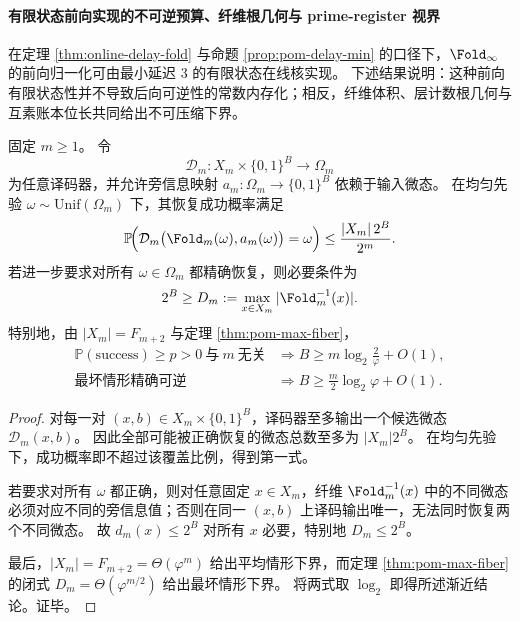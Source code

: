 \paragraph{有限状态前向实现的不可逆预算、纤维根几何与 prime-register 视界}
在定理 \ref{thm:online-delay-fold} 与命题 \ref{prop:pom-delay-min} 的口径下，\(\Fold_\infty\) 的前向归一化可由最小延迟 \(3\) 的有限状态在线核实现。
下述结果说明：这种前向有限状态性并不导致后向可逆性的常数内存化；相反，纤维体积、层计数根几何与互素账本位长共同给出不可压缩下界。

\begin{theorem}\label{thm:xi-time-part9k-fold-forward-online-not-constant-memory-reversible}
固定 \(m\ge 1\)。
令
\[
\mathcal D_m:X_m\times\{0,1\}^{B}\to\Omega_m
\]
为任意译码器，并允许旁信息映射
\(
a_m:\Omega_m\to\{0,1\}^{B}
\)
依赖于输入微态。
在均匀先验 \(\omega\sim\mathrm{Unif}(\Omega_m)\) 下，其恢复成功概率满足
\[
\mathbb P\!\Bigl(\mathcal D_m\bigl(\Fold_m(\omega),a_m(\omega)\bigr)=\omega\Bigr)
\le
\frac{|X_m|\,2^{B}}{2^m}.
\]
若进一步要求对所有 \(\omega\in\Omega_m\) 都精确恢复，则必要条件为
\[
2^{B}\ge D_m:=\max_{x\in X_m}|\Fold_m^{-1}(x)|.
\]
特别地，由 \(|X_m|=F_{m+2}\) 与定理 \ref{thm:pom-max-fiber}，
\begin{align*}
\mathbb P(\text{success})\ge p>0\ \text{与}\ m\ \text{无关}
&\Longrightarrow
B\ge m\log_2\!\frac{2}{\varphi}+O(1),\\
\text{最坏情形精确可逆}
&\Longrightarrow
B\ge \frac{m}{2}\log_2\varphi+O(1).
\end{align*}
\end{theorem}
\begin{proof}
对每一对 \((x,b)\in X_m\times\{0,1\}^{B}\)，译码器至多输出一个候选微态 \(\mathcal D_m(x,b)\)。
因此全部可能被正确恢复的微态总数至多为 \(|X_m|2^B\)。
在均匀先验下，成功概率即不超过该覆盖比例，得到第一式。

若要求对所有 \(\omega\) 都正确，则对任意固定 \(x\in X_m\)，纤维 \(\Fold_m^{-1}(x)\) 中的不同微态必须对应不同的旁信息值；否则在同一 \((x,b)\) 上译码输出唯一，无法同时恢复两个不同微态。
故 \(d_m(x)\le 2^B\) 对所有 \(x\) 必要，特别地 \(D_m\le 2^B\)。

最后，\(|X_m|=F_{m+2}=\Theta(\varphi^m)\) 给出平均情形下界，而定理 \ref{thm:pom-max-fiber} 的闭式
\(
D_m=\Theta(\varphi^{m/2})
\)
给出最坏情形下界。
将两式取 \(\log_2\) 即得所述渐近结论。证毕。
\end{proof}

